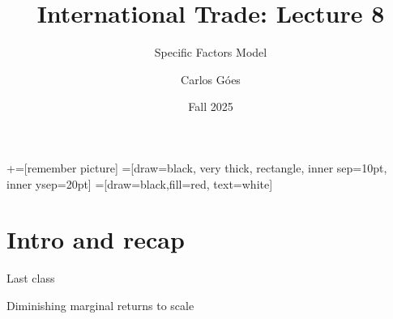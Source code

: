 \documentclass[notes,11pt, aspectratio=169, xcolor=table]{beamer}
\title[]{International Trade: Lecture 8}
\subtitle[]{Specific Factors Model}
\author[Góes]
{Carlos Góes\inst{1}}
\date{Fall 2025}
\institute[GWU]{\inst{1} George Washington University }
\newenvironment{wideitemize}{\itemize\addtolength{\itemsep}{10pt}}{\enditemize}
\begin{document}
\newcommand\marktopleft[1]{%
    \tikz[overlay,remember picture] 
        \node (marker-#1-a) at (-.3em,.3em) {};%
}
\newcommand\markbottomright[2]{%
    \tikz[overlay,remember picture] 
        \node (marker-#1-b) at (0em,0em) {};%
}
+=[remember picture] 
 =[draw=black, very thick, rectangle, inner sep=10pt, inner ysep=20pt]
 =[draw=black,fill=red, text=white]















\frame{\titlepage}
\addtocounter{framenumber}{-1}




\section{Intro and recap}

\begin{frame}{Last class}
\begin{wideitemize}
    \item Diminishing marginal returns to scale
    \item 
\end{wideitemize}
\end{frame}
\end{document}
